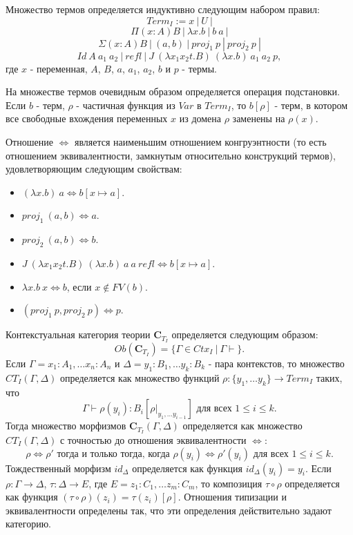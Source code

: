 \documentclass{amsart}
\theoremstyle{definition}
\theoremstyle{remark}
\newcommand{\deq}{\Leftrightarrow}
\newcommand{\cat}[1]{\mathbf{#1}}
\renewcommand{\C}{\cat{C}}
\numberwithin{figure}{section}
\begin{document}
Множество термов определяется индуктивно следующим набором правил:
\[ Term_I := x\ |\ U\ | \]
\[ \Pi (x : A) B\ |\ \lambda x. b\ |\ b\ a\ | \]
\[ \Sigma (x : A) B\ |\ (a, b)\ |\ proj_1\ p\ |\ proj_2\ p\ | \]
\[ Id\ A\ a_1\ a_2\ |\ refl\ |\ J\ (\lambda x_1 x_2 t. B)\ (\lambda x. b)\ a_1\ a_2\ p, \]
где $x$ - переменная, $A$, $B$, $a$, $a_1$, $a_2$, $b$ и $p$ - термы.

На множестве термов очевидным образом определяется операция подстановки.
Если $b$ - терм, $\rho$ - частичная функция из $Var$ в $Term_I$, то $b[\rho]$ - терм, в котором все свободные вхождения переменных $x$ из домена $\rho$ заменены на $\rho(x)$.

Отношение $\deq$ является наименьшим отношением конгруэнтности (то есть отношением эквивалентности, замкнутым относительно конструкций термов), удовлетворяющим следующим свойствам:
\begin{itemize}
\item $(\lambda x. b)\ a \deq b[x \mapsto a]$.
\item $proj_1\ (a, b) \deq a$.
\item $proj_2\ (a, b) \deq b$.
\item $J\ (\lambda x_1 x_2 t. B)\ (\lambda x. b)\ a\ a\ refl \deq b[x \mapsto a]$.
\item $\lambda x. b\ x \deq b$, если $x \notin FV(b)$.
\item $(proj_1\ p, proj_2\ p) \deq p$.
\end{itemize}

Контекстуальная категория теории $\C_{T_I}$ определяется следующим образом:
\[ Ob(\C_{T_I}) = \{ \Gamma \in Ctx_I\ |\ \Gamma \vdash \}. \]
Если $\Gamma = x_1 : A_1, \ldots x_n : A_n$ и $\Delta = y_1 : B_1, \ldots y_k : B_k$ - пара контекстов,
то множество $CT_I(\Gamma, \Delta)$ определяется как множество функций $\rho : \{ y_1, \ldots y_k\} \to Term_I$ таких, что
\[ \Gamma \vdash \rho(y_i) : B_i[\rho |_{y_1, \ldots y_{i-1}}] \text{ для всех } 1 \leq i \leq k. \]
Тогда множество морфизмов $\C_{T_I}(\Gamma, \Delta)$ определяется как множество $CT_I(\Gamma, \Delta)$ с точностью до отношения эквивалентности $\deq$:
\[ \rho \deq \rho' \text{ тогда и только тогда, когда } \rho(y_i) \deq \rho'(y_i) \text{ для всех } 1 \leq i \leq k. \]
Тождественный морфизм $id_\Delta$ определяется как функция $id_\Delta(y_i) = y_i$.
Если $\rho : \Gamma \to \Delta$, $\tau : \Delta \to E$, где $E = z_1 : C_1, \ldots z_m : C_m$, то композиция $\tau \circ \rho$ определяется как функция $(\tau \circ \rho)(z_i) = \tau(z_i)[\rho]$.
Отношения типизации и эквивалентности определены так, что эти определения действительно задают категорию.
\end{document}
